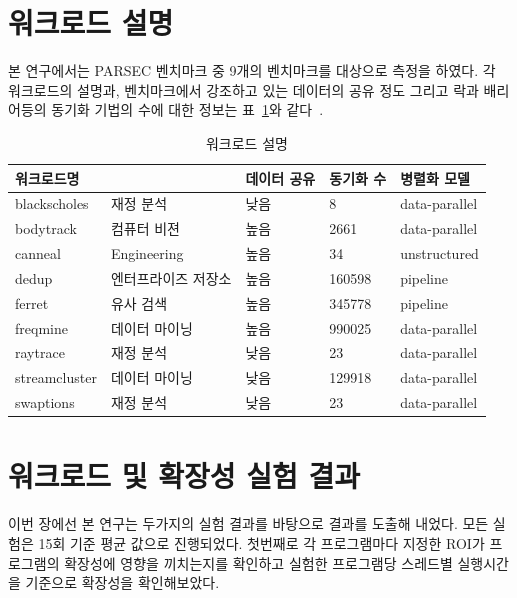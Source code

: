 \documentclass{kcc}
\begin{document}
\section{워크로드 설명}
본 연구에서는 PARSEC 벤치마크 중 9개의 벤치마크를 대상으로 측정을 하였다. 
각 워크로드의 설명과, 벤치마크에서 강조하고 있는 데이터의 공유 정도 그리고
 락과 배리어등의 동기화 기법의 수에 대한 정보는  표~\ref{tab:workload}와 같다~\cite{parsecbench}.

\begin{table}[h!]
  \caption{워크로드 설명}
  \centering
  \scriptsize 
  \begin{tabular}{l l l l l} \toprule 
    워크로드명 &  & 데이터 공유 & 동기화 수 & 병렬화 모델\\
    \midrule
    blackscholes & 재정 분석 & 낮음 & 8 & data-parallel\\
    \midrule
    bodytrack & 컴퓨터 비젼 & 높음 & 2661 & data-parallel\\
    \midrule
    canneal & Engineering & 높음 & 34 & unstructured\\
    \midrule
    dedup & 엔터프라이즈 저장소 & 높음 & 160598 & pipeline\\
    \midrule
    ferret & 유사 검색 & 높음 & 345778 & pipeline\\
    \midrule
    freqmine & 데이터 마이닝 & 높음 & 990025 & data-parallel\\
    \midrule
    raytrace & 재정 분석 & 낮음 & 23 & data-parallel \\
    \midrule
    streamcluster & 데이터 마이닝 & 낮음 & 129918 & data-parallel\\
    \midrule
    swaptions & 재정 분석 & 낮음 & 23 & data-parallel \\
    \bottomrule
  \end{tabular}
  \label{tab:workload}
\end{table}

\section{워크로드 및 확장성 실험 결과}
 이번 장에선 본 연구는 두가지의 실험 결과를 바탕으로 결과를 도출해 내었다. 모든 실험은 15회 기준 평균 값으로 진행되었다.
첫번째로 각 프로그램마다 지정한 ROI가 프로그램의 확장성에 영향을 끼치는지를 확인하고 실험한 프로그램당 스레드별 실행시간을 기준으로 확장성을 확인해보았다.
\end{document}

